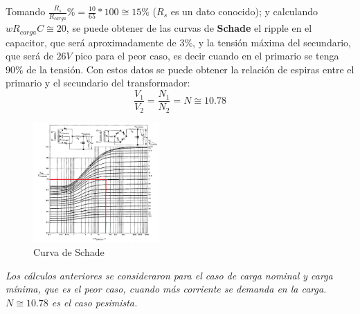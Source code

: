 \documentclass[letterpaper, 10 pt, conference]{ieeeconf}  %
\begin{document}
Tomando $\frac{R_s}{R_{carga}}\% = \frac{10}{65}*100 \cong 15\%$ ($R_s$ es un dato conocido); y calculando $wR_{carga}C \cong 20$, se puede obtener de las curvas de \textbf{Schade} el ripple en el capacitor, que será aproximadamente de $3\%$, y la tensión máxima del secundario, que será de $26V$ pico para el peor caso, es decir cuando en el primario se tenga $90\%$ de la tensión. Con estos datos se puede obtener la relación de espiras entre el primario y el secundario del transformador:
\begin{equation}
  \frac{V_1}{V_2} = \frac{N_1}{N_2} = N \cong 10.78
\end{equation}

\begin{figure}[H]
  \centering
  \includegraphics[width=0.43\textwidth]{./imagenes/schade_edc_et.png}
  \caption{Curva de Schade}
  \label{fig:schade_edc_sobre_etmax}
\end{figure}

\textit{Los cálculos anteriores se consideraron para el caso de carga nominal y carga mínima, que es el peor caso, cuando más corriente se demanda en la carga. $N \cong 10.78$ es el caso pesimista.}
\end{document}
